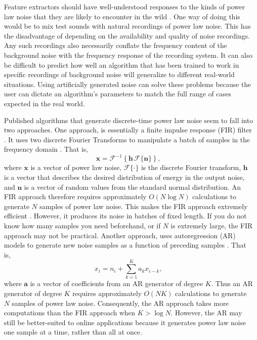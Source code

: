 \documentclass[preprint]{JASA}
\begin{document}
Feature extractors should have well-understood responses to the kinds of power law noise that they are likely to encounter in the wild \citep{beckham:austin:1975}.
One way of doing this would be to mix test sounds with natural recordings of power law noise.
This has the disadvantage of depending on the availability and quality of noise recordings.
Any such recordings also necessarily conflate the frequency content of the background noise with the frequency response of the recording system.
It can also be difficult to predict how well an algorithm that has been trained to work in specific recordings of background noise will generalize to different real-world situations.
Using artificially generated noise can solve these problems because the user can dictate an algorithm's parameters to match the full range of cases expected in the real world.

Published algorithms that generate discrete-time power law noise seem to fall into two approaches.
One approach, is essentially a finite impulse response (FIR) filter \citep{kasdin_walter:1992}.
It uses two discrete Fourier Transforms to manipulate a batch of samples in the frequency domain \citep{zhivorimov:2018}.
That is,
\begin{equation}
  \mathbf{x} = \mathcal{F}^{-1}\left\{\mathbf{h}\,\mathcal{F}\{\mathbf{n}\}\right\},
\end{equation}
where $\mathbf{x}$ is a vector of power law noise, $\mathcal{F}\{\cdot\}$ is the discrete Fourier transform, $\mathbf{h}$ is a vector that describes the desired distribution of energy in the output noise, and $\mathbf{n}$ is a vector of random values from the standard normal distribution.
An FIR approach therefore requires approximately $O(N \log N)$ calculations to generate $N$ samples of power law noise.
This makes the FIR approach extremely efficient \citep{zhivorimov:2018}.
However, it produces its noise in batches of fixed length.
If you do not know how many samples you need beforehand, or if $N$ is extremely large, the FIR approach may not be practical.
Another approach, uses autoregression (AR) models to generate new noise samples as a function of preceding samples \citep{pachet:etal:2015}.
That is,
\begin{equation}
  x_i = n_i + \sum_{k=1}^Ka_kx_{i-k},
\end{equation}
where $\mathbf{a}$ is a vector of coefficients from an AR generator of degree $K$.
Thus an AR generator of degree $K$ requires approximately $O(NK)$ calculations to generate $N$ samples of power law noise.
Consequently, the AR approach takes more computations than the FIR approach when $K>\log N$.
However, the AR may still be better-suited to online applications because it generates power law noise one sample at a time, rather than all at once.
\end{document}
